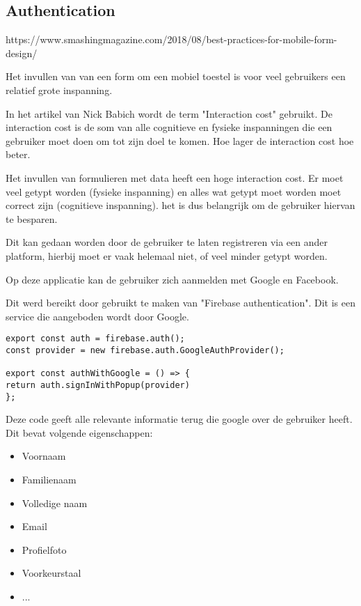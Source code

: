 	
	
	
	\subsection{Authentication}
	
		https://www.smashingmagazine.com/2018/08/best-practices-for-mobile-form-design/
		
		Het invullen van van een form om een mobiel toestel is voor veel gebruikers een relatief grote inspanning.
		
		In het artikel van Nick Babich wordt de term "Interaction cost" gebruikt. De interaction cost is de som van alle cognitieve en fysieke inspanningen die een gebruiker moet doen om tot zijn doel te komen. Hoe lager de interaction cost hoe beter.
		
		Het invullen van formulieren met data heeft een hoge interaction cost. Er moet veel getypt worden (fysieke inspanning) en alles wat getypt moet worden moet correct zijn (cognitieve inspanning). het is dus belangrijk om de gebruiker hiervan te besparen.
		
		Dit kan gedaan worden door de gebruiker te laten registreren via een ander platform, hierbij moet er vaak helemaal niet, of veel minder getypt worden.
		
		Op deze applicatie kan de gebruiker zich aanmelden met Google en Facebook.
		
		Dit werd bereikt door gebruikt te maken van "Firebase authentication". Dit is een service die aangeboden wordt door Google.
		
		
		
\begin{lstlisting}
export const auth = firebase.auth();
const provider = new firebase.auth.GoogleAuthProvider();

export const authWithGoogle = () => {
return auth.signInWithPopup(provider)
};
\end{lstlisting}
	
		Deze code geeft alle relevante informatie terug die google over de gebruiker heeft. Dit bevat volgende eigenschappen:
		\begin{itemize}
			\item Voornaam
			\item Familienaam
			\item Volledige naam
			\item Email
			\item Profielfoto
			\item Voorkeurstaal
			\item ...
		\end{itemize} 
		
